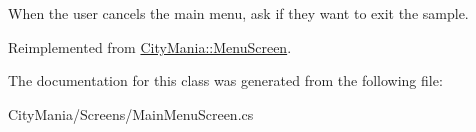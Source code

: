 When the user cancels the main menu, ask if they want to exit the sample. 

Reimplemented from \hyperlink{classCityMania_1_1MenuScreen_adba6d36ac9e5f30e2e3c2147c7510bf0}{CityMania::MenuScreen}.

The documentation for this class was generated from the following file:\begin{DoxyCompactItemize}
\item 
CityMania/Screens/MainMenuScreen.cs\end{DoxyCompactItemize}
